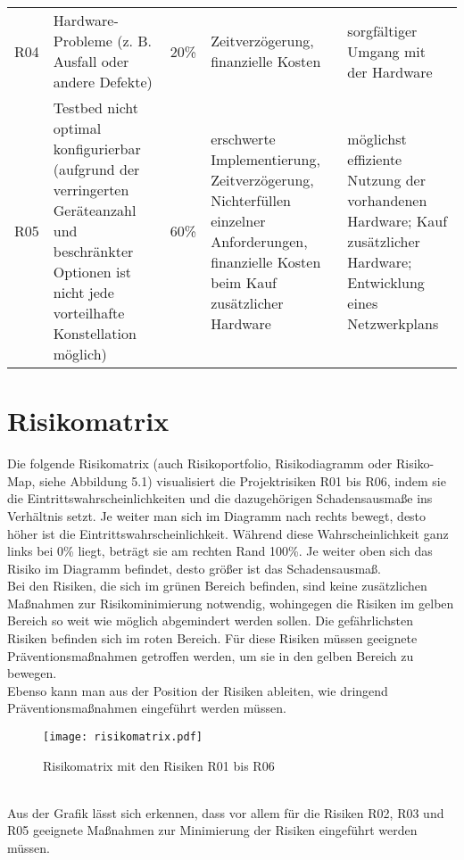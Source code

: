 \documentclass[../review_1.tex]{subfiles}
\begin{document}
\begin{longtable}[h]{l p{} p{} p{} p{}}
    R04         & Hardware-Probleme (z. B. Ausfall oder andere Defekte)                                                                                                     & 20\%                                  & Zeitverzögerung, finanzielle Kosten                                                                                                                                                                       & sorgfältiger Umgang mit der Hardware                                                                                                                                                                                         \\
    R05         & Testbed nicht optimal konfigurierbar (aufgrund der verringerten Geräteanzahl und beschränkter Optionen ist nicht jede vorteilhafte Konstellation möglich) & 60\%                                  & erschwerte Implementierung, Zeitverzögerung, Nichterfüllen einzelner Anforderungen, finanzielle Kosten beim Kauf zusätzlicher Hardware & möglichst effiziente Nutzung der vorhandenen Hardware; Kauf zusätzlicher Hardware; Entwicklung eines Netzwerkplans                                                                                                           \\
\end{longtable}

\section{Risikomatrix}
\noindent Die folgende Risikomatrix (auch Risikoportfolio, Risikodiagramm oder Risiko-Map, siehe Abbildung 5.1) visualisiert die Projektrisiken R01 bis R06, indem sie die Eintrittswahrscheinlichkeiten und die dazugehörigen Schadensausmaße ins Verhältnis setzt. Je weiter man sich im Diagramm nach rechts bewegt, desto höher ist die Eintrittswahrscheinlichkeit. Während diese Wahrscheinlichkeit ganz links bei 0\% liegt, beträgt sie am rechten Rand 100\%. Je weiter oben sich das Risiko im Diagramm befindet, desto größer ist das Schadensausmaß.\\
Bei den Risiken, die sich im grünen Bereich befinden, sind keine zusätzlichen Maßnahmen zur Risikominimierung notwendig, wohingegen die Risiken im gelben Bereich so weit wie möglich abgemindert werden sollen. Die gefährlichsten Risiken befinden sich im roten Bereich. Für diese Risiken müssen geeignete Präventionsmaßnahmen getroffen werden, um sie in den gelben Bereich zu bewegen.\\
Ebenso kann man aus der Position der Risiken ableiten, wie dringend Präventionsmaßnahmen eingeführt werden müssen.\\
\begin{figure} [h]
    \centering
    \texttt{[image: risikomatrix.pdf]}
    \caption{Risikomatrix mit den Risiken R01 bis R06}
\end{figure}
\\ \newline Aus der Grafik lässt sich erkennen, dass vor allem für die Risiken R02, R03 und R05 geeignete Maßnahmen zur Minimierung der Risiken eingeführt werden müssen.
\end{document}
